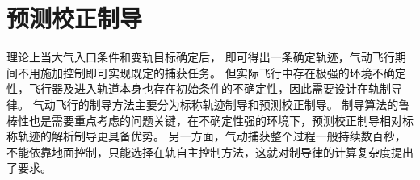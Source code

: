 \section{预测校正制导}
理论上当大气入口条件和变轨目标确定后，
即可得出一条确定轨迹，气动飞行期间不用施加控制即可实现既定的捕获任务。
但实际飞行中存在极强的环境不确定性，飞行器及进入轨道本身也存在初始条件的不确定性，因此需要设计在轨制导律。
气动飞行的制导方法主要分为标称轨迹制导和预测校正制导。
制导算法的鲁棒性也是需要重点考虑的问题关键，在不确定性强的环境下，预测校正制导相对标称轨迹的解析制导更具备优势。
另一方面，气动捕获整个过程一般持续数百秒，不能依靠地面控制，只能选择在轨自主控制方法，这就对制导律的计算复杂度提出了要求\cite{dqingyuan2019}。

